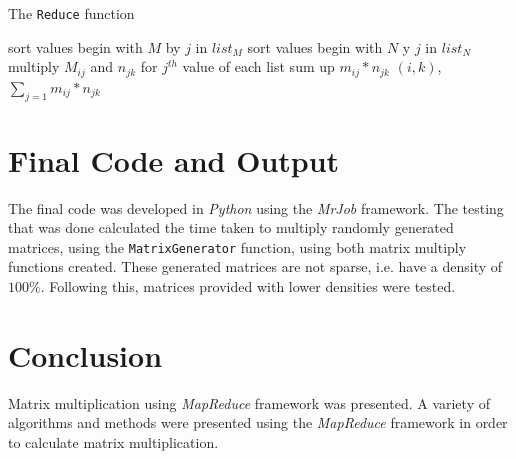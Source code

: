 \documentclass[10pt, conference]{IEEEtran}
\def\code#1{\texttt{#1}}
\begin{document}
\begin{algorithm}[h!]
\caption{The \code{Reduce} function~\cite{lendapp}}
\label{Reduce Algorithm}
\begin{algorithmic} 
	\STATE sort values begin with $M$ by $j$ in $list_M$
	\STATE sort values begin with $N$ y $j$ in $list_N$
	\STATE multiply $M_{ij}$ and $n_{jk}$ for $j^{th}$ value of each list
	\STATE sum up $m_{ij} * n_{jk}$
\ENDFOR
\RETURN $(i,k)$, $\sum_{j=1}^{}m_{ij} * n_{jk}$


\end{algorithmic}
\end{algorithm}


\section{Final Code and Output}
\label{Final Code and Output}
The final code was developed in \emph{Python} using the \emph{MrJob} framework. The testing that was done calculated the time taken to multiply randomly generated matrices, using the \code{MatrixGenerator} function, using both matrix multiply functions created. These generated matrices are not sparse, i.e. have a density of $100\%$. Following this, matrices provided with lower densities were tested.


\section{Conclusion}
\label{Conclusion}
Matrix multiplication using \emph{MapReduce} framework was presented. A variety of algorithms and methods were presented using the \emph{MapReduce} framework in order to calculate matrix multiplication.
\end{document}
